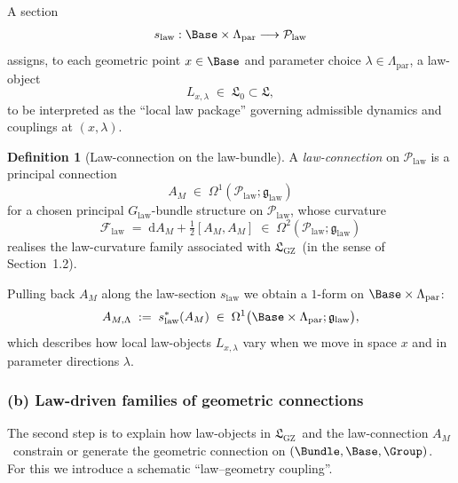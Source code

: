 \documentclass[11pt]{book}
\theoremstyle{plain}
\theoremstyle{definition}
\newtheorem{definition}[theorem]{Definition} \theoremstyle{remark}
\newcommand{\GZLS}{\ensuremath{\mathfrak{L}_{\mathrm{GZ}}}}       \newcommand{\GZLT}{\ensuremath{M_{!w}}}                           \newcommand{\GZLOC}{\ensuremath{A_M}}                             \newcommand{\GZLCurv}{\ensuremath{\mathcal{F}_{\mathrm{law}}}}
\begin{document}
A section
\[
   s_{\mathrm{law}}:
      \Base\times\Lambda_{\mathrm{par}}
      \longrightarrow \mathcal{P}_{\mathrm{law}}
\]
assigns, to each geometric point $x\in\Base$ and parameter choice
$\lambda\in\Lambda_{\mathrm{par}}$, a law-object
\[
   L_{x,\lambda}
   \;\in\;
   \mathfrak{L}_0\subset\mathfrak{L},
\]
to be interpreted as the “local law package” governing admissible
dynamics and couplings at $(x,\lambda)$.



\begin{definition}[Law-connection on the law-bundle]
A \emph{law-connection} on $\mathcal{P}_{\mathrm{law}}$ is a principal
  connection
  \[
     \GZLOC\;\in\;\Omega^1(\mathcal{P}_{\mathrm{law}};\mathfrak{g}_{\mathrm{law}})
  \]
  for a chosen principal $G_{\mathrm{law}}$-bundle structure on
  $\mathcal{P}_{\mathrm{law}}$, whose curvature
  \[
     \GZLCurv
     \;=\;
     \mathrm{d}\GZLOC
     + \tfrac12[\GZLOC,\GZLOC]
     \;\in\;
     \Omega^2(\mathcal{P}_{\mathrm{law}};\mathfrak{g}_{\mathrm{law}})
  \]
  realises the law-curvature family associated with \GZLS\ (in the sense
  of Section~1.2).
\end{definition}

Pulling back $\GZLOC$ along the law-section $s_{\mathrm{law}}$ we obtain
a $1$-form on $\Base\times\Lambda_{\mathrm{par}}$:
\[
   A_{M,\Lambda}
   \;:=\;
   s_{\mathrm{law}}^*(\GZLOC)
   \;\in\;
   \Omega^1\bigl(\Base\times\Lambda_{\mathrm{par}};
                 \mathfrak{g}_{\mathrm{law}}\bigr),
\]
which describes how local law-objects $L_{x,\lambda}$ vary when we move
in space $x$ and in parameter directions $\lambda$.



\subsubsection*{(b) Law-driven families of geometric connections}

The second step is to explain how law-objects in \GZLS\ and the
law-connection \GZLOC\ constrain or generate the geometric connection
on $(\Bundle,\Base,\Group)$. For this we introduce a schematic
“law–geometry coupling”.
\end{document}
